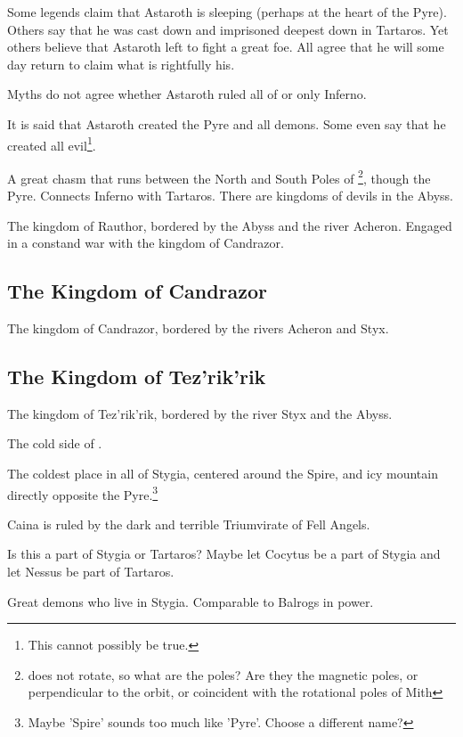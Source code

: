 Some legends claim that Astaroth is sleeping (perhaps at the heart of the Pyre). Others say that he was cast down and imprisoned deepest down in Tartaros. Yet others believe that Astaroth left \Tuat{} to fight a great foe. All agree that he will some day return to claim what is rightfully his. 

Myths do not agree whether Astaroth ruled all of \Tuat{} or only Inferno. 

It is said that Astaroth created the Pyre and all demons. Some even say that he created all evil\footnote{This cannot possibly be true.}. 



A great chasm that runs between the North and South Poles of \Tuat{}\footnote{\Tuat{} does not rotate, so what are the poles? Are they the magnetic poles, or perpendicular to the orbit, or coincident with the rotational poles of Mith}, though the Pyre. Connects Inferno with Tartaros. There are kingdoms of devils in the Abyss. 



The kingdom of Rauthor, bordered by the Abyss and the river Acheron. Engaged in a constand war with the kingdom of Candrazor. 

\subsection{The Kingdom of Candrazor}
The kingdom of Candrazor, bordered by the rivers Acheron and Styx. 

\subsection{The Kingdom of Tez'rik'rik}
The kingdom of Tez'rik'rik, bordered by the river Styx and the Abyss. 



The cold side of \Tuat{}. 

The coldest place in all of Stygia, centered around the Spire, and icy mountain directly opposite the Pyre.\footnote{Maybe 'Spire' sounds too much like 'Pyre'. Choose a different name?} 

Caina is ruled by the dark and terrible Triumvirate of Fell Angels.

Is this a part of Stygia or Tartaros? Maybe let Cocytus be a part of Stygia and let Nessus be part of Tartaros. 

Great demons who live in Stygia. Comparable to Balrogs in power. 



